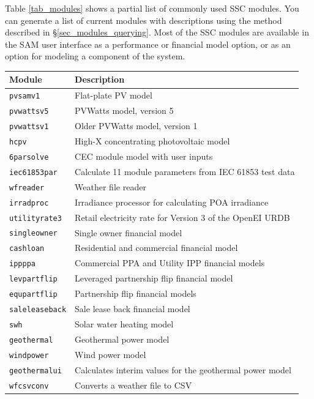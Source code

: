 \documentclass{scrartcl} %
\begin{document}
Table \ref{tab_modules} shows a partial list of commonly used SSC modules. You can generate a list of current modules with descriptions using the method described in \S\ref{sec_modules_querying}. Most of the SSC modules are available in the SAM user interface as a performance or financial model option, or as an option for modeling a component of the system.

\begin{table}
\begin{center}
\begin{tabular}{ll}
Module & Description\\ \hline
\texttt{pvsamv1} & Flat-plate PV model\\
\texttt{pvwattsv5} & PVWatts model, version 5\\
\texttt{pvwattsv1} & Older PVWatts model, version 1\\
\texttt{hcpv} & High-X concentrating photovoltaic model\\
\texttt{6parsolve} & CEC module model with user inputs\\
\texttt{iec61853par} & Calculate 11 module parameters from IEC 61853 test data\\
\texttt{wfreader} & Weather file reader\\
\texttt{irradproc} & Irradiance processor for calculating POA irradiance\\
\texttt{utilityrate3} & Retail electricity rate for Version 3 of the OpenEI URDB\\
\texttt{singleowner} & Single owner financial model\\
\texttt{cashloan} & Residential and commercial financial model\\
\texttt{ippppa} & Commercial PPA and Utility IPP financial models\\
\texttt{levpartflip} & Leveraged partnership flip financial model\\
\texttt{equpartflip} & Partnership flip financial models\\
\texttt{saleleaseback} & Sale lease back financial model\\
\texttt{swh} & Solar water heating model\\
\texttt{geothermal} & Geothermal power model\\
\texttt{windpower} & Wind power model\\
\texttt{geothermalui} & Calculates interim values for the geothermal power model\\
\texttt{wfcsvconv} & Converts a weather file to CSV\\

\end{tabular}
\end{center}
\end{table}
\end{document}
